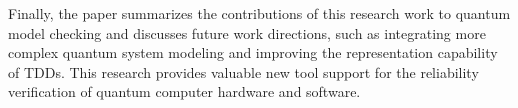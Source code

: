 Finally, the paper summarizes the contributions of this research work to quantum model checking and discusses future work directions, such as integrating more complex quantum system modeling and improving the representation capability of TDDs. This research provides valuable new tool support for the reliability verification of quantum computer hardware and software.


\pagestyle{enfrontmatterstyle}%
\cleardoublepage\pagestyle{frontmatterstyle}%


